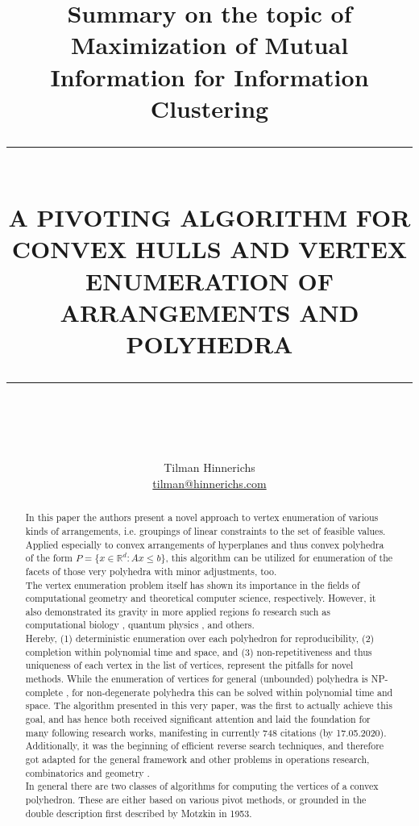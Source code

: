 \documentclass[]{article}
\title{Summary on the topic of Maximization of Mutual Information for Information Clustering}
\author{Tilman Hinnerichs\\
\href{mailto:tilman@hinnerichs.com}{tilman@hinnerichs.com}}
\date{}
\newcommand{\HRule}[1]{\rule{\linewidth}{#1}}
\begin{document}
	
	\title{ \normalsize
		\HRule{0.5pt} \\
		\LARGE \textbf{\uppercase{A Pivoting Algorithm for Convex Hulls and Vertex Enumeration of Arrangements and Polyhedra}}
		\HRule{0.5pt} \\ [0.5cm]
		\normalsize }

\maketitle
\begin{abstract}
	In this paper the authors present a novel approach to vertex enumeration of various kinds of arrangements, i.e. groupings of linear constraints to the set of feasible values.  Applied especially to convex arrangements of hyperplanes and thus convex polyhedra of the form $P=\{x\in \mathbb{R}^d: Ax\leq b\}$, this algorithm can be utilized for enumeration of the facets of those very polyhedra with minor adjustments, too.\\
		
	The vertex enumeration problem itself has shown its importance in the fields of computational geometry and theoretical computer science, respectively. However, it also demonstrated its gravity in more applied regions fo research such as computational biology \cite{compBio}\cite{Acuna2012}\cite{Gagneur2004}, quantum physics \cite{BellEqu}, and others.\\
	
	Hereby, (1) deterministic enumeration over each polyhedron for reproducibility, (2) completion within polynomial  time and space, and (3) non-repetitiveness and thus uniqueness of each vertex in the list of vertices, represent the pitfalls for novel methods. While the enumeration of vertices for general (unbounded) polyhedra is NP-complete \cite{Khachiyan2008}, for non-degenerate polyhedra this can be solved within polynomial time and space. The algorithm presented in this very paper, was the first to actually achieve this goal, and has hence both received significant attention and laid the foundation for many following research works, manifesting in currently 748 citations (by 17.05.2020). Additionally, it was the beginning of efficient reverse search techniques, and therefore got adapted for the general framework and other problems in operations research, combinatorics and geometry \cite{Avis1996}.\\
	
	In general there are two classes of algorithms for computing the vertices of a convex polyhedron. These are either based on various pivot methods, or grounded in the \glqq double description\grqq{} first described by Motzkin\cite{Motzkin} in 1953.\\
	

\end{abstract}
\end{document}
